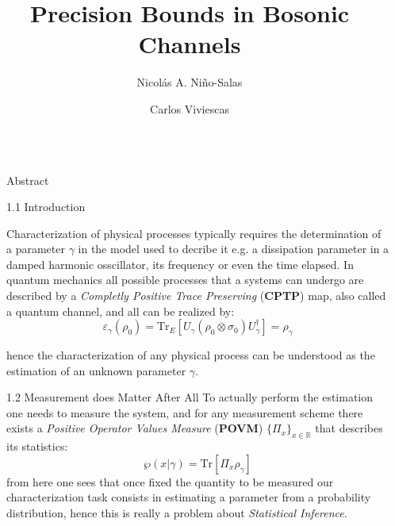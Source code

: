 \documentclass[final]{beamer}
\title{Precision Bounds in Bosonic Channels}
\author{Nicolás A. Niño-Salas \inst{1} \and Carlos Viviescas  \inst{2} }
\institute[shortinst]{Universidad Nacional de Colombia, Sede Bogotá }
\newlength{\sepwidth}
\newlength{\colwidth}
\newcommand{\separatorcolumn}{\begin{column}{\sepwidth}\end{column}}
\begin{document}
\begin{frame}[t]
\begin{columns}[t]
\separatorcolumn

\begin{column}{\colwidth}

  \begin{block}{Abstract}
  \end{block}

  \begin{block}{1.1 Introduction}
  \end{block}
  Characterization of physical processes typically requires the determination of a parameter $\gamma$ in the model used to decribe it e.g.
  a dissipation parameter in a damped harmonic osscillator, its frequency or even the time elapsed. In quantum mechanics
  all possible processes that a systems can undergo are described by a \textit{Completly Positive Trace Preserving} (\textbf{CPTP}) map, also
  called a quantum channel, and all can be realized by:
{\LARGE
  \begin{equation*}
       \varepsilon_{\gamma}\left(\rho_{0}\right)=\mathrm{Tr}_{E}\left[ U_{\gamma}\left( \rho_{0} \otimes \sigma_{0} \right)U_{\gamma}^{\dagger}\right]=\rho_{\gamma}
  \end{equation*}
}

  hence the characterization of any physical process can be understood as the estimation of an unknown parameter $\gamma$.
  \begin{block}{1.2 Measurement does Matter After All}
    To actually perform the estimation one needs to measure the system, and for any measurement scheme there exists a \textit{Positive
      Operator Values Measure} (\textbf{POVM}) $\{\Pi_{x}\}_{x \in \mathbb{R}}$ that describes its statistics:
{\LARGE
  \begin{equation*}
     \wp(x | \gamma)= \mathrm{Tr}\left[\Pi_{x} \rho_{\gamma}\right]
  \end{equation*}
}
from here one sees that once fixed the quantity to be measured our characterization task consists in estimating a parameter from a probability
distribution, hence this is really a problem about \textit{Statistical Inference}.





\end{block}
\end{column}
\end{columns}
\end{frame}
\end{document}
